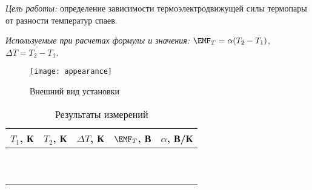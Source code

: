 \documentclass[10pt, pscyr, nonums]{hedlabwork}
\date{13.11.2013}
\begin{document}
  \makeheader

  \emph{Цель работы:} определение зависимости термоэлектродвижущей силы
  термопары от разности температур спаев.

  \emph{Используемые при расчетах формулы и значения:}
  \( \EMF_T = \alpha (T_2 - T_1) \), \( \Delta T = T_2 - T_1 \).

  \begin{figure}[h!]
    \center
    \texttt{[image: appearance]} \\
    \parbox{.5\textwidth}{\caption{Внешний вид установки}}
  \end{figure}
  \vspace*{-2em}

  \begin{table}[h!]
    \center \caption{Результаты измерений}
    \begin{tabular}{|*{5}{C{.12}|}} \hline
      \( T_1 \), К & \( T_2 \), К & \( \Delta T \), К &
        \( \EMF_T \), В & \( \alpha \), В/К \\ \hline
       &&&&  \\ 
      &&&& \\ 
      &&&& \\ 
      &&&& \\ 
      &&&& \\ 
      &&&& \\ 
      &&&& \\ 
      &&&& \\ 
      &&&& \\ 
      &&&& \\ \hline
    \end{tabular}
  \end{table}
\end{document}
